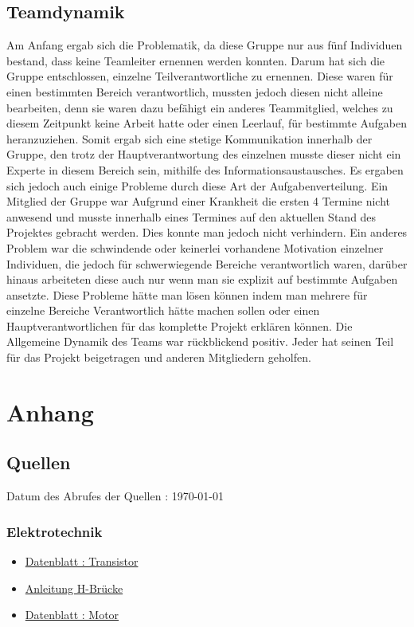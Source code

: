 \documentclass[notitlepage]{report}
\begin{document}
\section{Teamdynamik}

Am Anfang ergab sich die Problematik, da diese Gruppe nur aus f\"{u}nf Individuen bestand, dass keine Teamleiter ernennen werden  konnten. Darum hat sich die Gruppe entschlossen, einzelne Teilverantwortliche zu ernennen. Diese waren f\"{u}r einen bestimmten Bereich verantwortlich, mussten jedoch diesen nicht alleine bearbeiten, denn sie waren dazu bef\"{a}higt ein anderes Teammitglied, welches zu diesem Zeitpunkt keine Arbeit hatte oder einen Leerlauf, f\"{u}r bestimmte Aufgaben heranzuziehen.
Somit ergab sich eine stetige Kommunikation innerhalb der Gruppe, den trotz der Hauptverantwortung des einzelnen musste dieser nicht ein Experte in diesem Bereich sein, mithilfe des Informationsaustausches.
Es ergaben sich jedoch auch einige Probleme durch diese Art der Aufgabenverteilung. Ein Mitglied der Gruppe war Aufgrund einer Krankheit die ersten 4 Termine nicht anwesend und musste innerhalb eines Termines auf den aktuellen Stand des Projektes gebracht werden. Dies konnte man jedoch nicht verhindern. Ein anderes Problem war die schwindende oder keinerlei vorhandene Motivation einzelner Individuen, die jedoch f\"{u}r schwerwiegende Bereiche verantwortlich waren, dar\"{u}ber hinaus arbeiteten diese auch nur wenn man sie explizit auf bestimmte Aufgaben ansetzte. 
Diese Probleme h\"{a}tte man l\"{o}sen k\"{o}nnen indem man mehrere f\"{u}r einzelne Bereiche Verantwortlich h\"{a}tte machen sollen oder einen Hauptverantwortlichen f\"{u}r das komplette Projekt erkl\"{a}ren k\"{o}nnen.
Die Allgemeine Dynamik des Teams war r\"{u}ckblickend positiv. Jeder hat seinen Teil f\"{u}r das Projekt beigetragen und anderen Mitgliedern geholfen.


\chapter{Anhang}

\section{Quellen}

Datum des Abrufes der Quellen : \today

\subsection{Elektrotechnik}
\begin{itemize}

\item \href{http://cdn-reichelt.de/documents/datenblatt/A100/BC546_48-CDIL.pdf}{Datenblatt : Transistor}


\item \href{http://anleitung.joy-it.net/wp-content/uploads/2017/06/SBC-MotoDriver2-Anleitung.pdf}{Anleitung H-Br\"{u}cke}

\item \href{http://cdn-reichelt.de/documents/datenblatt/A300/COM_MOTOR_RAD_DB-DE.pdf}{Datenblatt : Motor}

\end{itemize}
\end{document}
